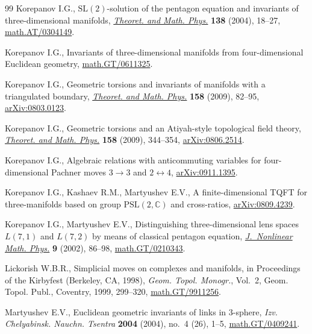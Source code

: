 \documentclass[pdftex]{sigma}
\begin{document}
\begin{thebibliography}{99}
Korepanov I.G.,
$\mathrm{SL}(2)$-solution of the pentagon equation and invariants of three-dimensional manifolds,
\href{http://dx.doi.org/10.1023/B:TAMP.0000010629.96356.52}{{\it Theoret. and Math. Phys.}} {\bf 138} (2004), 18--27,
\href{http://arxiv.org/abs/math.AT/0304149}{math.AT/0304149}.

Korepanov I.G.,
Invariants of three-dimensional manifolds from four-dimensional Euclidean geometry,
\href{http://arxiv.org/abs/math.GT/0611325}{math.GT/0611325}.

Korepanov I.G.,
Geometric torsions and invariants of manifolds with a triangulated boundary,
\href{http://dx.doi.org/10.1007/s11232-009-0006-6}{{\it Theoret. and Math. Phys.}} {\bf 158} (2009), 82--95,
\href{http://arxiv.org/abs/0803.0123}{arXiv:0803.0123}.

Korepanov I.G.,
Geometric torsions and an Atiyah-style topological f\/ield theory,
\href{http://dx.doi.org/10.1007/s11232-009-0028-0}{{\it Theoret. and Math. Phys.}} {\bf 158} (2009), 344--354,
\href{http://arxiv.org/abs/0806.2514}{arXiv:0806.2514}.

Korepanov I.G.,
Algebraic relations with anticommuting variables for four-dimensional Pachner moves $3\to 3$ and $2 \leftrightarrow 4$, \href{http://arxiv.org/abs/0911.1395}{arXiv:0911.1395}.

Korepanov I.G., Kashaev R.M., Martyushev E.V.,
A f\/inite-dimensional TQFT for three-manifolds based on group $\mathrm{PSL}(2,\mathbb C)$ and cross-ratios, \href{http://arxiv.org/abs/0809.4239}{arXiv:0809.4239}.

Korepanov I.G., Martyushev E.V.,
Distinguishing three-dimensional lens spaces $L(7,1)$ and $L(7,2)$ by means of classical pentagon equation,
\href{http://dx.doi.org/10.2991/jnmp.2002.9.1.8}{{\it J.~Nonlinear Math. Phys.}} \textbf{9} (2002), 86--98,
\href{http://arxiv.org/abs/math.GT/0210343}{math.GT/0210343}.

Lickorish W.B.R.,
Simplicial moves on complexes and manifolds,
in Proceedings of the Kirbyfest (Berkeley, CA, 1998),
{\it Geom. Topol. Monogr.}, Vol.~2, Geom. Topol. Publ., Coventry, 1999, 299--320,
\href{http://arxiv.org/abs/math.GT/9911256}{math.GT/9911256}.

Martyushev E.V.,
Euclidean geometric invariants of links in 3-sphere,
{\it Izv. Chelyabinsk. Nauchn. Tsentra} \textbf{2004} (2004), no.~4 (26), 1--5,
\href{http://arxiv.org/abs/math.GT/0409241}{math.GT/0409241}.


\end{thebibliography}
\end{document}
